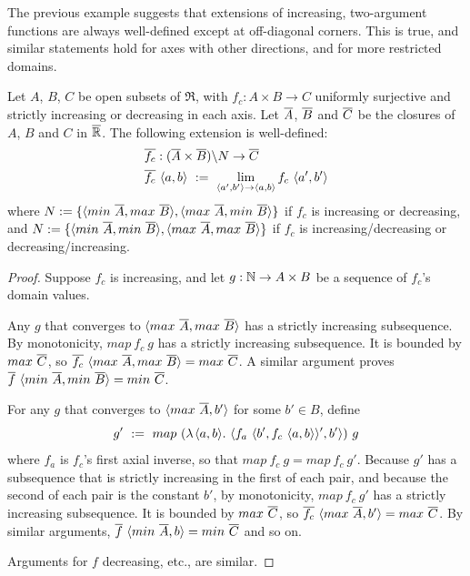 The previous example suggests that extensions of increasing, two-argument functions are always well-defined except at off-diagonal corners.
This is true, and similar statements hold for axes with other directions, and for more restricted domains.

\begin{theorem}
\label{thm:two-argument-extensions}
Let $A$, $B$, $C$ be open subsets of $\Re$, with $f_c : A \times B \to C$ uniformly surjective and strictly increasing or decreasing in each axis.
Let $\cl{A}$, $\cl{B}$ and $\cl{C}$ be the closures of $A$, $B$ and $C$ in $\cl{\Re}$.
The following extension is well-defined:
\begin{equation}
\begin{aligned}
	&\cl{f_c} : (\cl{A} \times \cl{B}) \w N \to \cl{C} \\
	&\cl{f_c}~\pair{a,b}\ :=\ \lim_{\pair{a',b'} \to \pair{a,b}} f_c~\pair{a',b'}
\end{aligned}
\end{equation}
where $N := \set{\pair{min~\cl{A},max~\cl{B}},\pair{max~\cl{A},min~\cl{B}}}$ if $f_c$ is increasing or decreasing, and
$N := \set{\pair{min~\cl{A},min~\cl{B}},\pair{max~\cl{A},max~\cl{B}}}$ if $f_c$ is increasing/decreasing or decreasing/increasing.
\end{theorem}
\begin{proof}
Suppose $f_c$ is increasing, and let $g : \mathbb{N} \to A \times B$ be a sequence of $f_c$'s domain values.

Any $g$ that converges to $\pair{max~\cl{A},max~\cl{B}}$ has a strictly increasing subsequence.
By monotonicity, $map~f_c~g$ has a strictly increasing subsequence.
It is bounded by $max~\cl{C}$, so $\cl{f_c}~\pair{max~\cl{A},max~\cl{B}} = max~\cl{C}$.
A similar argument proves $\cl{f}~\pair{min~\cl{A},min~\cl{B}} = min~\cl{C}$.

For any $g$ that converges to $\pair{max~\cl{A},b'}$ for some $b' \in B$, define
\begin{equation}
	g'\ :=\ map~(\fun{\pair{a,b}}\pair{f_a~\pair{b',f_c~\pair{a,b}}',b'})~g
\end{equation}
where $f_a$ is $f_c$'s first axial inverse, so that $map~f_c~g = map~f_c~g'$.
Because $g'$ has a subsequence that is strictly increasing in the first of each pair, and because the second of each pair is the constant $b'$, by monotonicity, $map~f_c~g'$ has a strictly increasing subsequence.
It is bounded by $max~\cl{C}$, so $\cl{f_c}~\pair{max~\cl{A},b'} = max~\cl{C}$.
By similar arguments, $\cl{f}~\pair{min~\cl{A},b} = min~\cl{C}$ and so on.

Arguments for $f$ decreasing, etc., are similar.
\end{proof}

